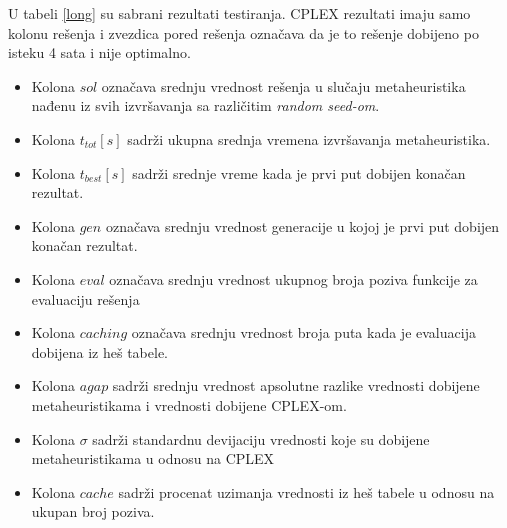 \documentclass[a4paper]{article}
\begin{document}
U tabeli \ref{long} su sabrani rezultati testiranja. CPLEX rezultati imaju samo kolonu rešenja i zvezdica pored rešenja označava da je to rešenje dobijeno po isteku 4 sata i nije optimalno. 
\begin{itemize}
\item
Kolona $sol$ označava srednju vrednost rešenja u slučaju metaheuristika nađenu iz svih izvršavanja sa različitim \emph{random seed-om}. 
\item Kolona $t_{tot}[s]$ sadrži ukupna srednja vremena izvršavanja metaheuristika.
\item Kolona $t_{best}[s]$ sadrži srednje vreme kada je prvi put dobijen konačan rezultat.
\item Kolona $gen$ označava srednju vrednost generacije u kojoj je prvi put dobijen konačan rezultat.
\item Kolona $eval$ označava srednju vrednost ukupnog broja poziva funkcije za evaluaciju rešenja
\item Kolona $caching$ označava srednju vrednost broja puta kada je evaluacija dobijena iz heš tabele.
\item Kolona $agap$ sadrži srednju vrednost apsolutne razlike vrednosti dobijene metaheuristikama i vrednosti dobijene CPLEX-om.
\item Kolona $\sigma$ sadrži standardnu devijaciju vrednosti koje su dobijene metaheuristikama u odnosu na CPLEX
\item Kolona $cache$ sadrži procenat uzimanja vrednosti iz heš tabele u odnosu na ukupan broj poziva.
\end{itemize}
\end{document}
